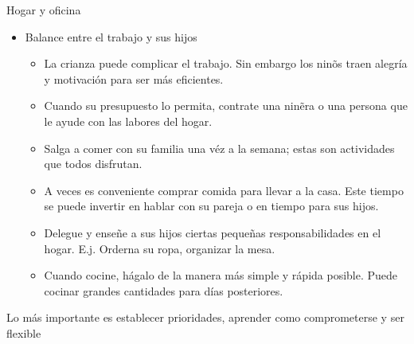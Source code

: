 \documentclass[
10pt,
aspectratio=169,
]{beamer}
\begin{document}
\begin{frame}[c]{Hogar y oficina}
\begin{itemize}
\item \alert{Balance entre el trabajo y sus hijos}
\begin{itemize}
\item La crianza puede complicar el trabajo. Sin embargo los nin\~os traen alegr\'ia y motivaci\'on para ser m\'as eficientes.
\item Cuando su presupuesto lo permita, contrate una nin\~era o una persona que le ayude con las labores del hogar. 
\item Salga a comer con su familia una v\'ez a la semana; estas son actividades que todos disfrutan.
\item A veces es conveniente comprar comida para llevar a la casa. Este tiempo se puede invertir en hablar con su pareja o en tiempo para sus hijos.
\item Delegue y ense\~ne a sus hijos ciertas peque\~nas responsabilidades en el hogar. E.j. Orderna su ropa, organizar la mesa.
\item Cuando cocine, h\'agalo de la manera m\'as simple y r\'apida posible. Puede cocinar grandes cantidades para d\'ias posteriores. 
\end{itemize}
\end{itemize}
Lo m\'as importante es establecer prioridades, aprender como comprometerse y ser flexible
\end{frame}
\end{document}
